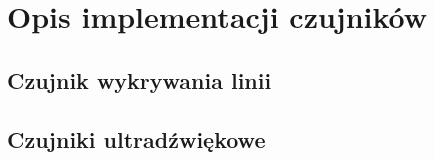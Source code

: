 \section{Opis implementacji czujników}
\subsection{Czujnik wykrywania linii}
\subsection{Czujniki ultradźwiękowe}